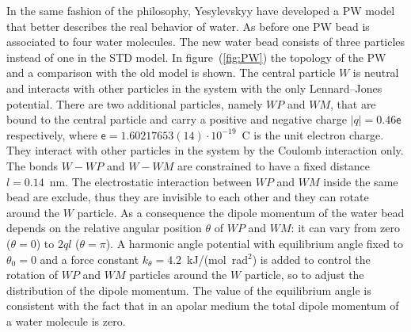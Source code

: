 In the same fashion of the \martini philosophy, Yesylevskyy \etal \cite{PW} have developed a \acf{PW} model
that better describes the real behavior of water. As before one \ac{PW} bead is associated to four water
molecules. The new water bead consists of three particles instead of one in the \ac{STD} \martini model. In
figure~(\ref{fig:PW}) the topology of the \ac{PW} and a comparison with the old model is shown. The central
particle $W$ is neutral and interacts with other particles in the system with the only Lennard--Jones potential.
There are two additional particles, namely $WP$ and $WM$, that are bound to the central particle and carry a
positive and negative charge $|q| = 0.46\mathsf{e}$ respectively, where
$\mathsf{e} = 1.60217653(14) \cdot 10^{-19}$~C is the unit electron charge. They interact with other particles in
the system by the Coulomb interaction only. The bonds $W-WP$ and $W-WM$ are constrained to have a fixed distance
$l = 0.14$~nm. The electrostatic interaction between $WP$ and $WM$ inside the same bead are exclude, thus they
are invisible to each other and they can rotate around the $W$ particle. As a consequence the dipole momentum of
the water bead depends on the relative angular position $\theta$ of $WP$ and $WM$: it can vary from zero
($\theta = 0$) to $2ql$ ($\theta = \pi$). A harmonic angle potential with equilibrium angle fixed to
$\theta_0 = 0$ and a force constant $k_\theta = 4.2$~kJ/(mol\ rad$^2$) is added to control the rotation of
$WP$ and $WM$ particles around the $W$ particle, so to adjust the distribution of the dipole momentum. The value
of the equilibrium angle is consistent with the fact that in an apolar medium the total dipole momentum of a
water molecule is zero.

